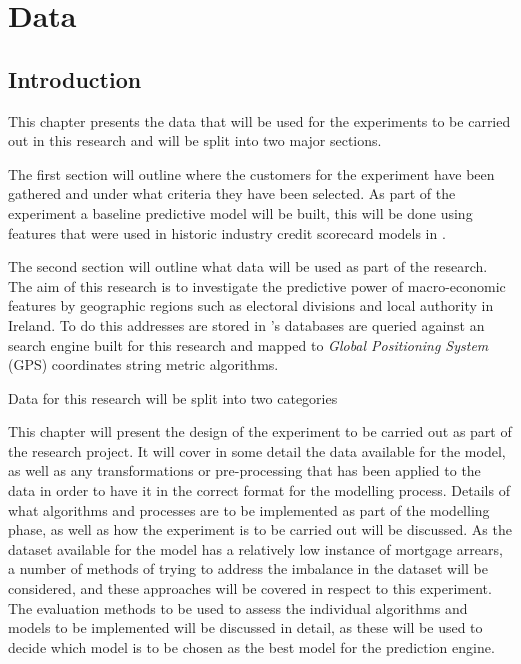 
\chapter{Data} %

\label{Chapter3} %


\section{Introduction}
This chapter presents the data that will be used for the experiments to be carried out in this research and will be split into two major sections. 

The first section will outline where the customers for the experiment have been gathered and under what criteria they have been selected. As part of the experiment a baseline predictive model will be built, this will be done using features that were used in historic industry credit scorecard models in \subjectname.

The second section will outline what data will be used as part of the research. The aim of this research is to investigate the predictive power of macro-economic features by geographic regions such as electoral divisions and local authority in Ireland. To do this addresses are stored in \subjectname's databases are queried against an search engine built for this research and mapped to \textit{Global Positioning System} (GPS) coordinates string metric algorithms.


Data for this research will be split into two categories


This chapter will present the design of the experiment to be carried out as part of the research project. It will cover in some detail the data available for the model, as well as any transformations or pre-processing that has been applied to the data in order to have it in the correct format for the modelling process.
Details of what algorithms and processes are to be implemented as part of the modelling phase, as well as how the experiment is to be carried out will be discussed. As the dataset available for the model has a relatively low instance of mortgage arrears, a number of methods of trying to address the imbalance in the dataset will be considered, and these approaches will be covered in respect to this experiment.
The evaluation methods to be used to assess the individual algorithms and models to be implemented will be discussed in detail, as these will be used to decide which model is to be chosen as the best model for the prediction engine.

